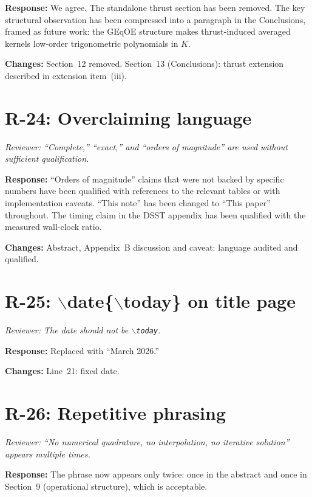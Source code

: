 \documentclass[11pt]{article}
\newcommand{\rev}[1]{\textcolor{revcolor}{\emph{#1}}}
\begin{document}
\textbf{Response:} We agree. The standalone thrust section has been removed.
The key structural observation has been compressed into a paragraph in the
Conclusions, framed as future work: the GEqOE structure makes thrust-induced
averaged kernels low-order trigonometric polynomials in $K$.

\textbf{Changes:} Section~12 removed. Section~13 (Conclusions): thrust
extension described in extension item~(iii).

\section*{R-24: Overclaiming language}

\rev{Reviewer: ``Complete,'' ``exact,'' and ``orders of magnitude'' are used
without sufficient qualification.}

\textbf{Response:} ``Orders of magnitude'' claims that were not backed by
specific numbers have been qualified with references to the relevant
tables or with implementation caveats. ``This note'' has been changed to
``This paper'' throughout. The timing claim in the DSST appendix has been
qualified with the measured wall-clock ratio.

\textbf{Changes:} Abstract, Appendix~B discussion and caveat: language
audited and qualified.

\section*{R-25: $\backslash$date\{$\backslash$today\} on title page}

\rev{Reviewer: The date should not be \texttt{$\backslash$today}.}

\textbf{Response:} Replaced with ``March 2026.''

\textbf{Changes:} Line~21: fixed date.

\section*{R-26: Repetitive phrasing}

\rev{Reviewer: ``No numerical quadrature, no interpolation, no iterative
solution'' appears multiple times.}

\textbf{Response:} The phrase now appears only twice: once in the abstract
and once in Section~9 (operational structure), which is acceptable.
\end{document}
